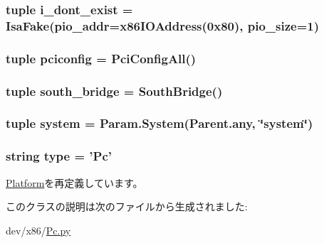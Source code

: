 \label{classPc_1_1Pc_a201a3870119ab6c7641e943a9216b0c1}
\hypertarget{classPc_1_1Pc_a458a45ec6ef2d8ac36ab638a4e51ae23}{
\subsubsection[{i\_\-dont\_\-exist}]{\setlength{\rightskip}{0pt plus 5cm}tuple {\bf i\_\-dont\_\-exist} = {\bf IsaFake}(pio\_\-addr=x86IOAddress(0x80), pio\_\-size=1)}}
\label{classPc_1_1Pc_a458a45ec6ef2d8ac36ab638a4e51ae23}
\hypertarget{classPc_1_1Pc_af76b12e7e603a8ef5f908080bb3e6fab}{
\subsubsection[{pciconfig}]{\setlength{\rightskip}{0pt plus 5cm}tuple {\bf pciconfig} = {\bf PciConfigAll}()}}
\label{classPc_1_1Pc_af76b12e7e603a8ef5f908080bb3e6fab}
\hypertarget{classPc_1_1Pc_ae171c2c77850539ffbcb383111d1ef6a}{
\subsubsection[{south\_\-bridge}]{\setlength{\rightskip}{0pt plus 5cm}tuple {\bf south\_\-bridge} = {\bf SouthBridge}()}}
\label{classPc_1_1Pc_ae171c2c77850539ffbcb383111d1ef6a}
\hypertarget{classPc_1_1Pc_ab737471139f5a296e5b26e8a0e1b0744}{
\subsubsection[{system}]{\setlength{\rightskip}{0pt plus 5cm}tuple {\bf system} = Param.System(Parent.any, \char`\"{}system\char`\"{})}}
\label{classPc_1_1Pc_ab737471139f5a296e5b26e8a0e1b0744}
\hypertarget{classPc_1_1Pc_acce15679d830831b0bbe8ebc2a60b2ca}{
\subsubsection[{type}]{\setlength{\rightskip}{0pt plus 5cm}string {\bf type} = '{\bf Pc}'}}
\label{classPc_1_1Pc_acce15679d830831b0bbe8ebc2a60b2ca}


\hyperlink{classPlatform_1_1Platform_acce15679d830831b0bbe8ebc2a60b2ca}{Platform}を再定義しています。

このクラスの説明は次のファイルから生成されました:\begin{DoxyCompactItemize}
\item 
dev/x86/\hyperlink{Pc_8py}{Pc.py}\end{DoxyCompactItemize}
